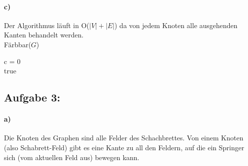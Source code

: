 \documentclass[a4paper]{article}
\begin{document}
\paragraph{c)}
Der Algorithmus läuft in O($|V| + |E|$) da von jedem Knoten alle ausgehenden 
Kanten behandelt werden. \\
\noindent Färbbar($G$)\\
\begin{algorithm}[H]
	c = 0 \\
	\Return true \\
\end{algorithm}

\subsection*{Aufgabe 3:}

\paragraph{a)}
Die Knoten des Graphen sind alle Felder des Schachbrettes.
Von einem Knoten (also Schabrett-Feld) gibt es eine Kante zu all den Feldern, 
auf die ein Springer sich (vom aktuellen Feld aus) bewegen kann.
\end{document}
